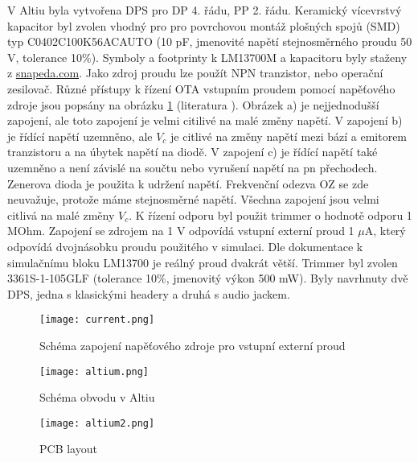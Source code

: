 \noindent V Altiu byla vytvořena DPS pro DP 4. řádu, PP 2. řádu. Keramický vícevrstvý kapacitor byl zvolen vhodný pro pro povrchovou montáž plošných spojů (SMD) typ C0402C100K56ACAUTO (10 pF, jmenovité napětí stejnosměrného proudu 50 V, tolerance 10\%). Symboly a footprinty k LM13700M a kapacitoru byly staženy z \url{snapeda.com}. Jako zdroj proudu lze použít NPN tranzistor, nebo operační zesilovač. Různé přístupy k řízení OTA vstupním proudem pomocí napěťového zdroje jsou popsány na obrázku \ref{s:DC} (literatura \cite{22}). Obrázek a) je nejjednodušší zapojení, ale toto zapojení je velmi citilivé na malé změny napětí. V zapojení b) je řídící napětí uzemněno, ale $V_c$ je citlivé na změny napětí mezi bází a emitorem tranzistoru a na úbytek napětí na diodě. V zapojení c) je řídící napětí také uzemněno a není závislé na součtu nebo vyrušení napětí na pn přechodech. Zenerova dioda je použita k udržení napětí. Frekvenční odezva OZ se zde neuvažuje, protože máme stejnosměrné napětí. Všechna zapojení jsou velmi citlivá na malé změny $V_c$. K řízení odporu byl použit trimmer o hodnotě odporu 1 MOhm. Zapojení se zdrojem na 1 V odpovídá vstupní externí proud 1 $\mu$A, který odpovídá dvojnásobku proudu použitého v simulaci. Dle dokumentace k simulačnímu bloku LM13700 je reálný proud dvakrát větší. Trimmer byl zvolen 3361S-1-105GLF (tolerance 10\%, jmenovitý výkon 500 mW). Byly navrhnuty dvě DPS, jedna s klasickými headery a druhá s audio jackem.
\begin{figure}[h]
\centering
\texttt{[image: current.png]}
\caption{Schéma zapojení napěťového zdroje pro vstupní externí proud \label{s:DC}}
\end{figure}
\begin{figure}[h]
\centering
\texttt{[image: altium.png]}
\caption{Schéma obvodu v Altiu}
\end{figure}
\begin{figure}[h]
\centering
\texttt{[image: altium2.png]}
\caption{PCB layout}
\end{figure}